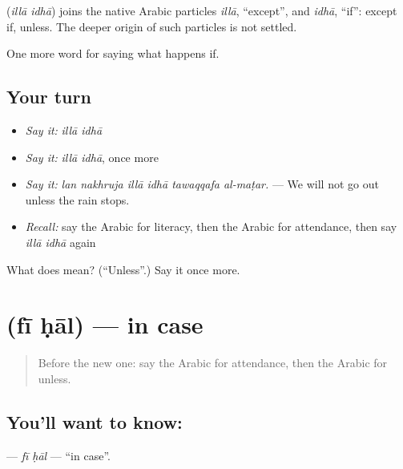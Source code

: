 \begin{cousinweb}
\textbf{ } (\emph{illā idhā}) joins the native Arabic particles \emph{illā}, \textquotedblleft{}except\textquotedblright{}, and \emph{idhā}, \textquotedblleft{}if\textquotedblright{}: except if, unless. The deeper origin of such particles is not settled.
\end{cousinweb}

\begin{grammarlens}[title={What you've built}]
One more word for saying what happens if.
\end{grammarlens}

\subsection*{Your turn}
\begin{itemize}
\raggedright
  \item \emph{Say it:} \emph{illā idhā}
  \item \emph{Say it:} \emph{illā idhā}, once more
  \item \emph{Say it:} \emph{lan nakhruja illā idhā tawaqqafa al-maṭar.} — We will not go out unless the rain stops.
  \item \emph{Recall:} say the Arabic for literacy, then the Arabic for attendance, then say \emph{illā idhā} again
\end{itemize}

\begin{tcolorbox}[breakable,colback=teal!4,colframe=teal!35!black,title={Before you move on}]
What does   mean? (\textquotedblleft{}Unless\textquotedblright{}.) Say it once more.
\end{tcolorbox}
\section[\texorpdfstring{\ar{في} \ar{حال} (fī ḥāl)}{في حال (fī ḥāl)}]{  (fī ḥāl) — in case}

\label{lesson:AR-C399-fi-hal}



\begin{quote}
Before the new one: say the Arabic for attendance, then the Arabic for unless.
\end{quote}

\subsection*{You'll want to know:  }
\textbf{ } — \emph{fī ḥāl} — \textquotedblleft{}in case\textquotedblright{}.

